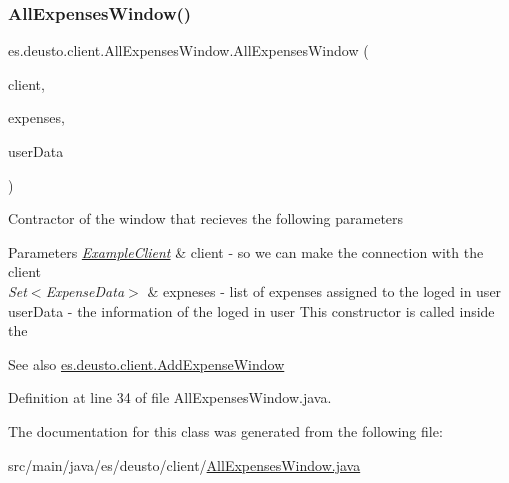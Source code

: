 \subsubsection{\texorpdfstring{All\+Expenses\+Window()}{AllExpensesWindow()}}
{\footnotesize\ttfamily es.\+deusto.\+client.\+All\+Expenses\+Window.\+All\+Expenses\+Window (\begin{DoxyParamCaption}\item[{\hyperlink{classes_1_1deusto_1_1client_1_1_example_client}{Example\+Client}}]{client,  }\item[{Set$<$ \hyperlink{classes_1_1deusto_1_1serialization_1_1_expense_data}{Expense\+Data} $>$}]{expenses,  }\item[{\hyperlink{classes_1_1deusto_1_1serialization_1_1_user_data}{User\+Data}}]{user\+Data }\end{DoxyParamCaption})}

Contractor of the window that recieves the following parameters 
\begin{DoxyParams}{Parameters}
{\em \hyperlink{classes_1_1deusto_1_1client_1_1_example_client}{Example\+Client}} & client -\/ so we can make the connection with the client \\
\hline
{\em Set$<$\+Expense\+Data$>$} & expneses -\/ list of expenses assigned to the loged in user  user\+Data -\/ the information of the loged in user This constructor is called inside the \\
\hline
\end{DoxyParams}
\begin{DoxySeeAlso}{See also}
\hyperlink{classes_1_1deusto_1_1client_1_1_add_expense_window}{es.\+deusto.\+client.\+Add\+Expense\+Window} 
\end{DoxySeeAlso}


Definition at line 34 of file All\+Expenses\+Window.\+java.



The documentation for this class was generated from the following file\+:\begin{DoxyCompactItemize}
\item 
src/main/java/es/deusto/client/\hyperlink{_all_expenses_window_8java}{All\+Expenses\+Window.\+java}\end{DoxyCompactItemize}
